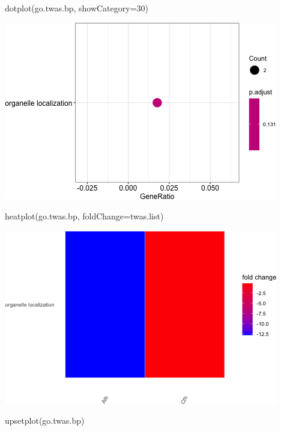 \documentclass[
]{article}
\newenvironment{Shaded}{\begin{snugshade}}{\end{snugshade}}
\newcommand{\AttributeTok}[1]{\textcolor[rgb]{0.77,0.63,0.00}{#1}}
\newcommand{\DecValTok}[1]{\textcolor[rgb]{0.00,0.00,0.81}{#1}}
\newcommand{\FunctionTok}[1]{\textcolor[rgb]{0.00,0.00,0.00}{#1}}
\newcommand{\NormalTok}[1]{#1}
\begin{document}
\begin{Shaded}
\begin{Highlighting}[]
\FunctionTok{dotplot}\NormalTok{(go.twas.bp, }\AttributeTok{showCategory=}\DecValTok{30}\NormalTok{)}
\end{Highlighting}
\end{Shaded}

\includegraphics{figures/twas-go-7.png}

\begin{Shaded}
\begin{Highlighting}[]
\FunctionTok{heatplot}\NormalTok{(go.twas.bp, }\AttributeTok{foldChange=}\NormalTok{twas.list)}
\end{Highlighting}
\end{Shaded}

\includegraphics{figures/twas-go-8.png}

\begin{Shaded}
\begin{Highlighting}[]
\FunctionTok{upsetplot}\NormalTok{(go.twas.bp)}
\end{Highlighting}
\end{Shaded}
\end{document}
